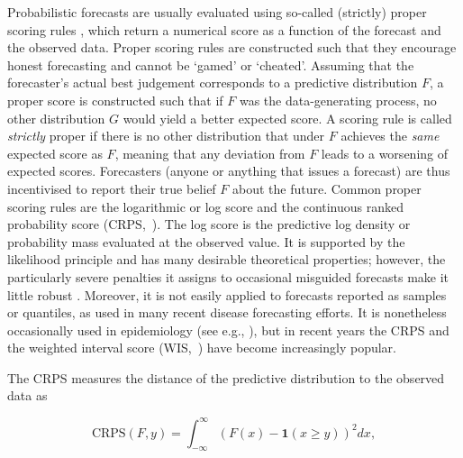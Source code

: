 \documentclass[10pt,letterpaper]{article}
\begin{document}
Probabilistic forecasts are usually evaluated using so-called (strictly) proper scoring rules \cite{gneitingStrictlyProperScoring2007}, which return a numerical score as a function of the forecast and the observed data. 
Proper scoring rules are constructed such that they encourage honest forecasting and cannot be `gamed' or `cheated'. 
Assuming that the forecaster's actual best judgement corresponds to a predictive distribution $F$, a proper score is constructed such that if $F$ was the data-generating process, no other distribution $G$ would yield a better expected score. A scoring rule is called \textit{strictly} proper if there is no other distribution that under $F$ achieves the \textit{same} expected score as $F$, meaning that any deviation from $F$ leads to a worsening of expected scores. Forecasters (anyone or anything that issues a forecast) are thus incentivised to report their true belief $F$ about the future. 
Common proper scoring rules are the logarithmic or log score \cite{goodRationalDecisions1952} and the continuous ranked probability score (CRPS,~\cite{gneitingStrictlyProperScoring2007}). The log score is the predictive log density or probability mass evaluated at the observed value. It is supported by the likelihood principle \cite{winklerScoringRulesEvaluation1996} and has many desirable theoretical properties; however, the particularly severe penalties it assigns to occasional misguided forecasts make it little robust \cite{bracherEvaluatingEpidemicForecasts2021}. Moreover, it is not easily applied to forecasts reported as samples or quantiles, as used in many recent disease forecasting efforts. It is nonetheless occasionally used in epidemiology (see e.g., \cite{heldProbabilisticForecastingInfectious2017, Johansson2019}), but in recent years the CRPS and the weighted interval score (WIS,~\cite{bracherEvaluatingEpidemicForecasts2021}) have become increasingly popular. 

The CRPS measures the distance of the predictive distribution to the observed data as 
\begin{linenomath*}
\begin{equation}
    \text{CRPS}(F, y) = \int_{-\infty}^\infty \left( F(x) - \boldsymbol{1}(x \geq y) \right)^2 dx,
\end{equation}    
\end{linenomath*}
\end{document}
